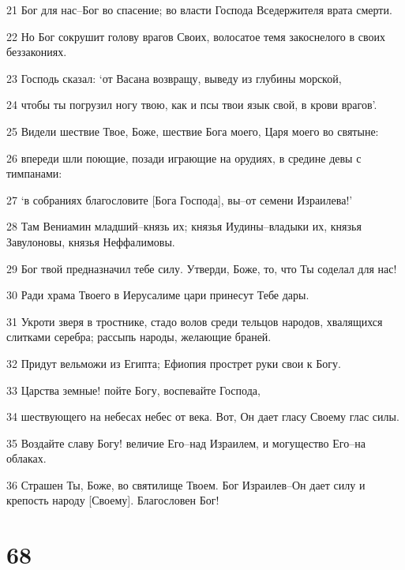 \par 21 Бог для нас--Бог во спасение; во власти Господа Вседержителя врата смерти.
\par 22 Но Бог сокрушит голову врагов Своих, волосатое темя закоснелого в своих беззакониях.
\par 23 Господь сказал: `от Васана возвращу, выведу из глубины морской,
\par 24 чтобы ты погрузил ногу твою, как и псы твои язык свой, в крови врагов'.
\par 25 Видели шествие Твое, Боже, шествие Бога моего, Царя моего во святыне:
\par 26 впереди шли поющие, позади играющие на орудиях, в средине девы с тимпанами:
\par 27 `в собраниях благословите [Бога Господа], вы--от семени Израилева!'
\par 28 Там Вениамин младший--князь их; князья Иудины--владыки их, князья Завулоновы, князья Неффалимовы.
\par 29 Бог твой предназначил тебе силу. Утверди, Боже, то, что Ты соделал для нас!
\par 30 Ради храма Твоего в Иерусалиме цари принесут Тебе дары.
\par 31 Укроти зверя в тростнике, стадо волов среди тельцов народов, хвалящихся слитками серебра; рассыпь народы, желающие браней.
\par 32 Придут вельможи из Египта; Ефиопия прострет руки свои к Богу.
\par 33 Царства земные! пойте Богу, воспевайте Господа,
\par 34 шествующего на небесах небес от века. Вот, Он дает гласу Своему глас силы.
\par 35 Воздайте славу Богу! величие Его--над Израилем, и могущество Его--на облаках.
\par 36 Страшен Ты, Боже, во святилище Твоем. Бог Израилев--Он дает силу и крепость народу [Своему]. Благословен Бог!

\chapter{68}

